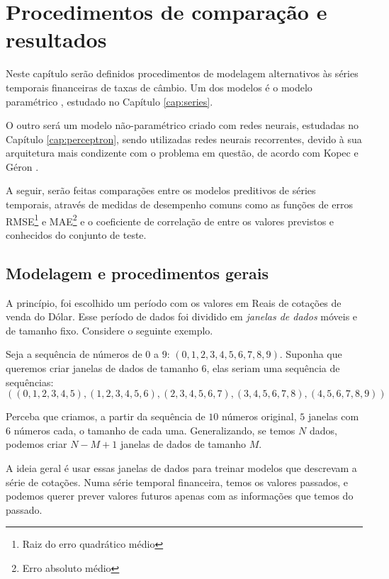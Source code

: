 
\chapter{Procedimentos de comparação e resultados}
\label{cap:comparacao}

Neste capítulo serão definidos procedimentos de modelagem alternativos às séries temporais financeiras de taxas de câmbio. Um dos modelos é o modelo paramétrico , estudado no Capítulo \ref{cap:series}. 

O outro será um modelo não-paramétrico criado com redes neurais, estudadas no Capítulo \ref{cap:perceptron}, sendo utilizadas redes neurais recorrentes, devido à sua arquitetura mais condizente com o problema em questão, de acordo com Kopec \citep{classic} e Géron \citep{hands}.

A seguir, serão feitas comparações entre os modelos preditivos de séries temporais, através de medidas de desempenho comuns como as funções de erros RMSE\footnote{Raiz do erro quadrático médio} e MAE\footnote{Erro absoluto médio} e o coeficiente de correlação de   entre os valores previstos e conhecidos do conjunto de teste.

\section{Modelagem e procedimentos gerais}

A princípio, foi escolhido um período com os valores em Reais de cotações de venda do Dólar. Esse período de dados foi dividido em \emph{janelas de dados} móveis e de tamanho fixo. Considere o seguinte exemplo. 

Seja a sequência de números de $0$ a $9$: $(0,1,2,3,4,5,6,7,8,9)$. Suponha que queremos criar janelas de dados de tamanho $6$, elas seriam uma sequência de sequências:
\[ ((0,1,2,3,4,5),(1,2,3,4,5,6),(2,3,4,5,6,7),(3,4,5,6,7,8),(4,5,6,7,8,9)) \]

Perceba que criamos, a partir da sequência de $10$ números original, $5$ janelas com $6$ números cada, o tamanho de cada uma. Generalizando, se temos $N$ dados, podemos criar $N{-}M{+}1$ janelas de dados de tamanho $M$.

A ideia geral é usar essas janelas de dados para treinar modelos que descrevam a série de cotações. Numa série temporal financeira, temos os valores passados, e podemos querer prever valores futuros apenas com as informações que temos do passado.

